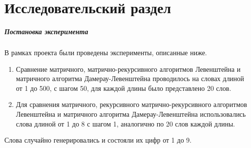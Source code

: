 \chapter{Исследовательский раздел}
\label{cha:research}
\paragraph{Постановка эксперимента}
В рамках проекта были проведены эксперименты, описанные ниже.
\begin{enumerate}[1.]
	\item Сравнение матричного, матрично-рекурсивного алгоритмов Левенштейна и матричного алгоритма Дамерау-Левенштейна проводилось на словах длиной от 1 до 500, с шагом 50, для каждой длины было представлено 20 слов.
	\item Для сравнения матричного, рекурсивного матрично-рекурсивного алгоритмов Левенштейна и матричного алгоритма Дамерау-Левенштейна использовались слова длиной от 1 до 8 с шагом 1, аналогично по 20 слов каждой длины.
\end{enumerate}
Слова случайно генерировались и состояли их цифр от 1 до 9.
